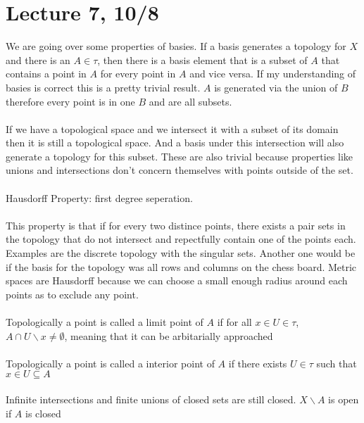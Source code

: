 \documentclass[12pt]{article}
\begin{document}
\newpage
\section{Lecture 7, 10/8}

We are going over some properties of basies. If a basis generates a topology for $X$ and there is an $A \in \tau$, then there is a basis element that is a subset of $A$ that contains a point in $A$ for every point in $A$ and vice versa. If my understanding of basies is correct this is a pretty trivial result. $A$ is generated via the union of $B$ therefore every point is in one $B$ and are all subsets. \\\\
If we have a topological space and we intersect it with a subset of its domain then it is still a topological space. And a basis under this intersection will also generate a topology for this subset. These are also trivial because properties like unions and intersections don't concern themselves with points outside of the set. \\\\
Hausdorff Property: first degree seperation. \\\\
This property is that if for every two distince points, there exists a pair sets in the topology that do not intersect and repectfully contain one of the points each. Examples are the discrete topology with the singular sets. Another one would be if the basis for the topology was all rows and columns on the chess board. Metric spaces are Hausdorff because we can choose a small enough radius around each points as to exclude any point.\\\\
Topologically a point is called a limit point of $A$ if for all $x \in U \in \tau$, $A \cap U \backslash x \neq \emptyset$, meaning that it can be arbitarially approached \\\\
Topologically a point is called a interior point of $A$ if there exists  $U \in \tau$ such that $x \in U \subseteq A$\\\\
Infinite intersections and finite unions of closed sets are still closed. $X \backslash A$ is open if $A$ is closed 

\newpage
\end{document}
